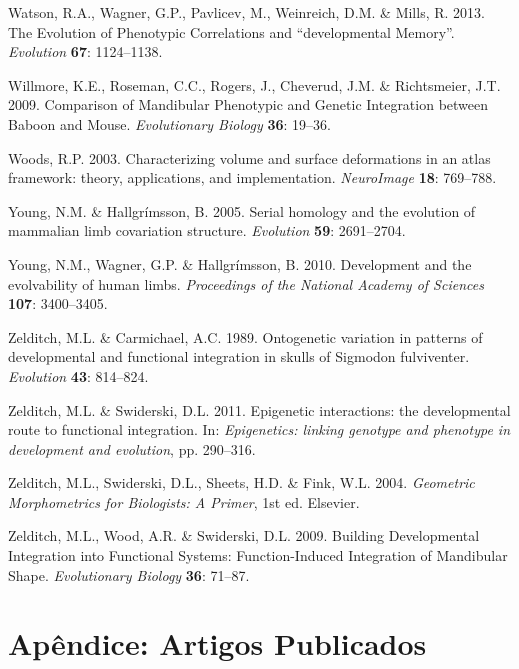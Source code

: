 \documentclass[11pt,twoside]{report}
\begin{document}
Watson, R.A., Wagner, G.P., Pavlicev, M., Weinreich, D.M. \& Mills, R.
2013. The Evolution of Phenotypic Correlations and ``developmental
Memory''. \emph{Evolution} \textbf{67}: 1124--1138.

Willmore, K.E., Roseman, C.C., Rogers, J., Cheverud, J.M. \&
Richtsmeier, J.T. 2009. Comparison of Mandibular Phenotypic and Genetic
Integration between Baboon and Mouse. \emph{Evolutionary Biology}
\textbf{36}: 19--36.

Woods, R.P. 2003. Characterizing volume and surface deformations in an
atlas framework: theory, applications, and implementation.
\emph{NeuroImage} \textbf{18}: 769--788.

Young, N.M. \& Hallgrímsson, B. 2005. Serial homology and the evolution
of mammalian limb covariation structure. \emph{Evolution} \textbf{59}:
2691--2704.

Young, N.M., Wagner, G.P. \& Hallgrímsson, B. 2010. Development and the
evolvability of human limbs. \emph{Proceedings of the National Academy
of Sciences} \textbf{107}: 3400--3405.

Zelditch, M.L. \& Carmichael, A.C. 1989. Ontogenetic variation in
patterns of developmental and functional integration in skulls of
Sigmodon fulviventer. \emph{Evolution} \textbf{43}: 814--824.

Zelditch, M.L. \& Swiderski, D.L. 2011. Epigenetic interactions: the
developmental route to functional integration. In: \emph{Epigenetics:
linking genotype and phenotype in development and evolution}, pp.
290--316.

Zelditch, M.L., Swiderski, D.L., Sheets, H.D. \& Fink, W.L. 2004.
\emph{Geometric Morphometrics for Biologists: A Primer}, 1st ed.
Elsevier.

Zelditch, M.L., Wood, A.R. \& Swiderski, D.L. 2009. Building
Developmental Integration into Functional Systems: Function-Induced
Integration of Mandibular Shape. \emph{Evolutionary Biology}
\textbf{36}: 71--87.

\chapter*{Apêndice: Artigos Publicados}






\end{document}
